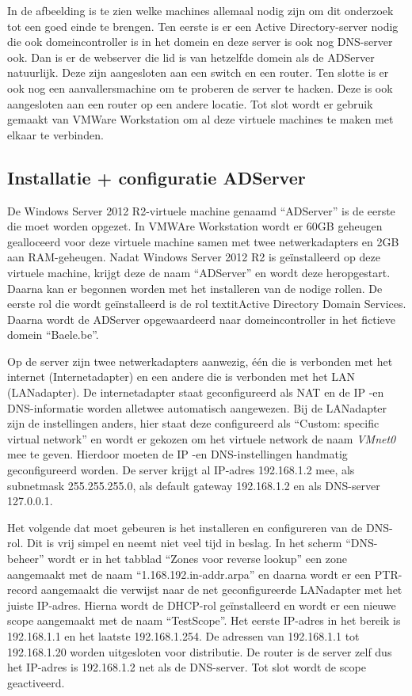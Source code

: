 \documentclass[pdftex,a4paper,12pt]{report}
\begin{document}
In de afbeelding is te zien welke machines allemaal nodig zijn om dit onderzoek tot een goed einde te brengen. Ten eerste is er een Active Directory-server nodig die ook domeincontroller is in het domein en deze server is ook nog DNS-server ook. Dan is er de webserver die lid is van hetzelfde domein als de ADServer natuurlijk. Deze zijn aangesloten aan een switch en een router. Ten slotte is er ook nog een aanvallersmachine om te proberen de server te hacken. Deze is ook aangesloten aan een router op een andere locatie. Tot slot wordt er gebruik gemaakt van VMWare Workstation om al deze virtuele machines te maken met elkaar te verbinden.

\subsection{Installatie + configuratie ADServer}
De Windows Server 2012 R2-virtuele machine genaamd "`ADServer"' is de eerste die moet worden opgezet. In VMWAre Workstation wordt er 60GB geheugen gealloceerd voor deze virtuele machine samen met twee netwerkadapters en 2GB aan RAM-geheugen. Nadat Windows Server 2012 R2 is geïnstalleerd op deze virtuele machine, krijgt deze de naam "`ADServer"' en wordt deze heropgestart. Daarna kan er begonnen worden met het installeren van de nodige rollen. De eerste rol die wordt geïnstalleerd is de rol textit{Active Directory Domain Services}. Daarna wordt de ADServer opgewaardeerd naar domeincontroller in het fictieve domein "`Baele.be"'. \newline 

Op de server zijn twee netwerkadapters aanwezig, één die is verbonden met het internet (Internetadapter) en een andere die is verbonden met het LAN (LANadapter). De internetadapter staat geconfigureerd als NAT en de IP -en DNS-informatie worden alletwee automatisch aangewezen. Bij de LANadapter zijn de instellingen anders, hier staat deze configureerd als "`Custom: specific virtual network"' en wordt er gekozen om het virtuele network de naam \textit{VMnet0} mee te geven. Hierdoor moeten de IP -en DNS-instellingen handmatig geconfigureerd worden. De server krijgt al IP-adres 192.168.1.2 mee, als subnetmask 255.255.255.0, als default gateway 192.168.1.2 en als DNS-server 127.0.0.1. \newline

Het volgende dat moet gebeuren is het installeren en configureren van de DNS-rol. Dit is vrij simpel en neemt niet veel tijd in beslag. In het scherm "`DNS-beheer"' wordt er in het tabblad "`Zones voor reverse lookup"' een zone aangemaakt met de naam "`1.168.192.in-addr.arpa"' en daarna wordt er een PTR-record aangemaakt die verwijst naar de net geconfigureerde LANadapter met het juiste IP-adres. Hierna wordt de DHCP-rol geïnstalleerd en wordt er een nieuwe scope aangemaakt met de naam "`TestScope"'. Het eerste IP-adres in het bereik is 192.168.1.1 en het laatste 192.168.1.254. De adressen van 192.168.1.1 tot 192.168.1.20 worden uitgesloten voor distributie. De router is de server zelf dus het IP-adres is 192.168.1.2 net als de DNS-server. Tot slot wordt de scope geactiveerd. \newline
\end{document}
